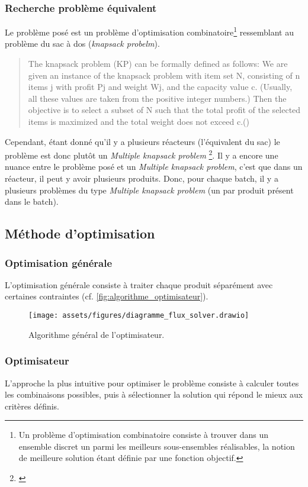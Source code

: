 \subsubsection{Recherche problème équivalent}
Le problème posé est un problème d'optimisation combinatoire\footnote{\og Un problème d'optimisation combinatoire consiste à trouver dans un ensemble discret un parmi les meilleurs sous-ensembles réalisables, la notion de meilleure solution étant définie par une fonction objectif.\fg \cite{wikepedia_combinatoire}} ressemblant au problème du sac à dos (\textit{knapsack probelm}).
\begin{quotation}
    \og The knapsack problem (KP) can be formally defined as follows: We are given an
    instance of the knapsack problem with item set N, consisting of n items j with profit
    Pj and weight Wj, and the capacity value c. (Usually, all these values are taken from
    the positive integer numbers.) Then the objective is to select a subset of N such
    that the total profit of the selected items is maximized and the total weight does not
    exceed c.\fg (\cite[p. 2]{KnapsackProblemsBook})
\end{quotation}
Cependant, étant donné qu'il y a plusieurs réacteurs (l'équivalent du sac) le problème est donc plutôt un \textit{Multiple knapsack problem} \footnote{\parencite[p. 285]{KnapsackProblemsBook}}. Il y a encore une nuance entre le problème posé et un \textit{Multiple knapsack problem}, c'est que dans un réacteur, il peut y avoir plusieurs produits. Donc, pour chaque batch, il y a plusieurs problèmes du type \textit{Multiple knapsack problem} (un par produit présent dans le \gls{batch}).
\subsection{Méthode d'optimisation}
\subsubsection{Optimisation générale}
L'optimisation générale consiste à traiter chaque produit séparément avec certaines contraintes (cf. \autoref{fig:algorithme_optimisateur}).
\begin{figure}[H]
    \centering
    \texttt{[image: assets/figures/diagramme\_flux\_solver.drawio]}
    \caption{Algorithme général de l'optimisateur.}
    \label{fig:algorithme_optimisateur}
\end{figure}

\subsubsection{Optimisateur}
L'approche la plus intuitive pour optimiser le problème consiste à calculer toutes les combinaisons possibles, puis à sélectionner la solution qui répond le mieux aux critères définis.


